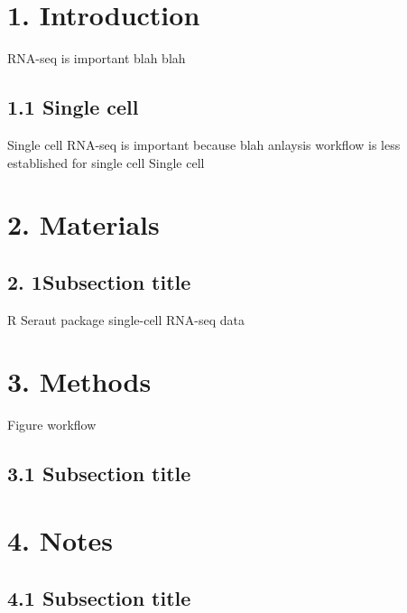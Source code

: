 \date{Received: date / Accepted: date}

\maketitle

\begin{Summary/Abstract}


\end{Summary/Abstract}

\section{1. Introduction}
\label{intro}
RNA-seq is important blah blah 
\subsection{1.1 Single cell}
\label{sec:1.1}
Single cell RNA-seq is important because blah
anlaysis workflow is less established for single cell
Single cell 
\section{2. Materials}
\label{materials}
\subsection{2. 1Subsection title}
\label{sec:2.1}
R
Seraut package
single-cell RNA-seq data

\section{3. Methods}
\label{methods}
Figure workflow
\subsection{3.1 Subsection title}
\label{sec:3.1}

\section{4. Notes}
\label{notes}
\subsection{4.1 Subsection title}
\label{sec:4.1}



